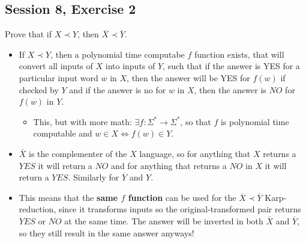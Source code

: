 \subsection {Session 8, Exercise 2}
\label{8_2}


Prove that if $X \prec Y$, then $\overline{X} \prec \overline{Y}$.



\begin{itemize}
    \item If $X \prec Y$, then a polynomial time computabe $f$ function exists, that will convert all inputs of $X$ into inputs of $Y$, such that if the answer is YES for a particular input word $w$ in $X$, then the answer will be YES for $f(w)$ if checked by $Y$ and if the answer is no for $w$ in $X$, then the answer is $NO$ for $f(w)$ in $Y$.
    \begin{itemize}
        \item This, but with more math: $\exists f: \Sigma^*\rightarrow\Sigma^*$, so that $f$ is polynomial time computable and $w\in{}X \Leftrightarrow f(w) \in{}Y$.
    \end{itemize}
    \item $\overline{X}$ is the complementer of the $X$ language, so for anything that $X$ returns a $YES$ it will return a $NO$ and for anything that returns a $NO$ in $X$ it will return a $YES$. Similarly for $\overline{Y}$ and $Y$.
    \item This means that the \textbf{same $f$ function} can be used for the $\overline{X} \prec \overline{Y}$ Karp-reduction, since it transforms inputs so the original-transformed pair returns $YES$ or $NO$ at the same time. The answer will be inverted in both $\overline{X}$ and $\overline{Y}$, so they still result in the same answer anyways!
\end{itemize}

